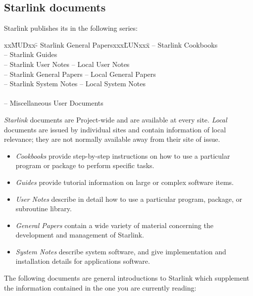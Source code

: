 \newpage

\subsection{Starlink documents}

Starlink publishes its
in the following series:

{\small
\begin{tabbing}
xx\=MUDxx\=- Starlink General Papersxxx\=LUNxx\=x\kill
{}\>-- Starlink Cookbooks\\
\>-- Starlink Guides\\
\>-- Starlink User Notes     \>-- Local User Notes\\
\>-- Starlink General Papers \>-- Local General Papers\\
\>-- Starlink System Notes   \>-- Local System Notes\\
\\
\>-- Miscellaneous User Documents
\end{tabbing}
}

{\em Starlink}\/ documents are Project-wide and are available at every site.
{\em Local}\/ documents are issued by individual sites and contain information
of local relevance; they are not normally available away from their site of
issue.

\begin{itemize}
\item {\em Cookbooks}\/ provide step-by-step instructions on how to use a
 particular program or package to perform specific tasks.
\item {\em Guides}\/ provide tutorial information on large or complex software
 items.
\item {\em User Notes}\/ describe in detail how to use a particular program,
 package, or subroutine library.
\item {\em General Papers}\/ contain a wide variety of material concerning the
 development and management of Starlink.
\item {\em System Notes}\/ describe system software, and give implementation and
 installation details for applications software.
\end{itemize}

The following documents are general introductions to Starlink which
supplement the information contained in the one you are currently reading:

